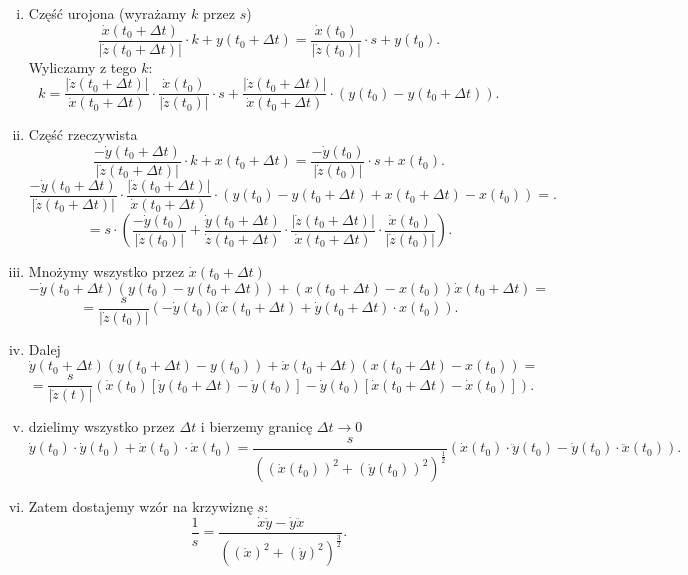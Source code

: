 \documentclass[../main.tex]{subfiles}
\begin{document}
\begin{enumerate}[i)]
    \item Część urojona (wyrażamy $k$ przez $s$)
\[
    \frac{\dot{x}(t_0 + \Delta t)}{\left| \dot{z}(t_0 + \Delta t) \right| }\cdot k + y(t_0 + \Delta t) = \frac{\dot{x}(t_0)}{\left| \dot{z}(t_0) \right| }\cdot s + y(t_0)
.\]
Wyliczamy z tego $k$:
\[
    k = \frac{\left| \dot{z}(t_0 + \Delta t) \right| }{\dot{x}(t_0 + \Delta t)} \cdot  \frac{\dot{x}(t_0)}{|\dot{z}(t_0)|}\cdot s + \frac{\left| \dot{z}(t_0 + \Delta t) \right| }{\dot{x}(t_0 + \Delta t)}\cdot (y(t_0) - y(t_0 + \Delta t))
.\]
\item Część rzeczywista
    \[
        \frac{-\dot{y}(t_0 + \Delta t)}{\left| \dot{z}(t_0 + \Delta t) \right| }\cdot k + x(t_0 + \Delta t) = \frac{-\dot{y}(t_0)}{\left| \dot{z}(t_0) \right| }\cdot s + x(t_0)
    .\]
\[
    \frac{-\dot{y}(t_0 + \Delta t)}{\left| \dot{z}(t_0 + \Delta t) \right| }\cdot \frac{\left|\dot{z}(t_0 + \Delta t)\right|}{\dot{x}(t_0 + \Delta t)}\cdot \left( y(t_0) - y(t_0 + \Delta t) + x(t_0 + \Delta t) - x(t_0) \right) =
.\]
\[
    = s\cdot \left( \frac{-\dot{y}(t_0)}{\left| \dot{z}(t_0) \right| } + \frac{\dot{y}(t_0 + \Delta t)}{\dot{z}(t_0 + \Delta t)}\cdot \frac{\left| \dot{z}(t_0 + \Delta t)\right|}{\dot{x}(t_0 + \Delta t)}\cdot \frac{\dot{x}(t_0)}{\left| \dot{z}(t_0) \right| }  \right)
.\]
\item Mnożymy wszystko przez $\dot{x}(t_0 + \Delta t)$
\[
    -\dot{y}(t_0 + \Delta t)\left( y(t_0) - y(t_0 + \Delta t)\right) + \left(x(t_0 + \Delta t) - x(t_0)\right)\dot{x}(t_0 + \Delta t) =
\]
    \[
           = \frac{s}{\left| \dot{z}(t_0) \right| }\left( -\dot{y}(t_0)(\dot{x}(t_0 + \Delta t) + \dot{y}(t_0 + \Delta t) \cdot x(t_0)\right)
.\]
\item Dalej
    \[
        \dot{y}(t_0 + \Delta t)\left( y(t_0 + \Delta t) - y(t_0) \right) + \dot{x}(t_0 + \Delta t) (x(t_0 + \Delta t) - x(t_0)) =
    \]
    \[
        = \frac{s}{\left| \dot{z}(t) \right| }\left( \dot{x}(t_0)\left[ \dot{y}(t_0 + \Delta t) - \dot{y}(t_0) \right] - \dot{y}(t_0) \left[ \dot{x}(t_0 + \Delta t) - \dot{x}(t_0) \right]  \right)
    .\]
\item dzielimy wszystko przez $\Delta t$ i bierzemy granicę $\Delta t \to 0$
    \[
        \dot{y}(t_0) \cdot \dot{y}(t_0) + \dot{x}(t_0) \cdot \dot{x}(t_0) = \frac{s}{\left( \left( \dot{x}(t_0) \right) ^2 + \left( \dot{y}(t_0) \right) ^2 \right)^{\frac{1}{2}}} \left( \dot{x}(t_0) \cdot \ddot{y}(t_0) - \dot{y}(t_0) \cdot \ddot{x}(t_0) \right)
    .\]
    \item Zatem dostajemy wzór na krzywiznę $s$:
        \[
            \frac{1}{s} = \frac{\dot{x}\ddot{y} - \dot{y}\ddot{x}}{\left( \left( \dot{x} \right) ^2 + \left( \dot{y} \right)^2  \right)^{\frac{3}{2}} }
        .\]
\end{enumerate}
\end{document}
